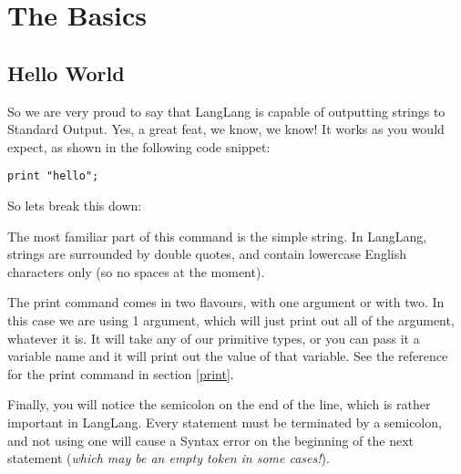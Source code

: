 \section{The Basics}
\subsection{Hello World}
\label{helloworld}
\begin{normalsize}
So we are very proud to say that LangLang is capable of outputting strings to Standard Output. Yes, a great feat, we know, we know! It works as you would expect, as shown in the following code snippet:

\begin{center}
\begin{minipage}{12cm}
\begin{verbatim}
print "hello";
\end{verbatim}
\end{minipage}
\end{center}

So lets break this down:

The most familiar part of this command is the simple string. In LangLang, strings are surrounded by double quotes, and contain lowercase English characters only (so no spaces at the moment).

The print command comes in two flavours, with one argument or with two. In this case we are using 1 argument, which will just print out all of the argument, whatever it is. It will take any of our primitive types, or you can pass it a variable name and it will print out the value of that variable. See the reference for the print command in section \ref{print}.

Finally, you will notice the semicolon on the end of the line, which is rather important in LangLang. Every statement must be terminated by a semicolon, and not using one will cause a Syntax error on the beginning of the next statement (\textit{which may be an empty token in some cases!}).
\end{normalsize}

